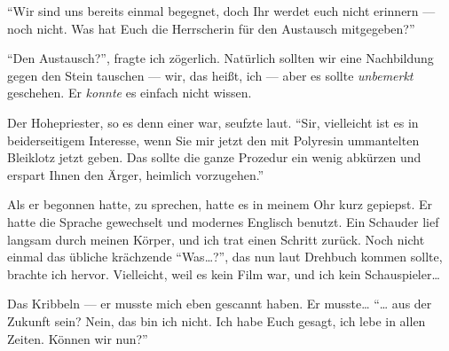 \enquote{Wir sind uns bereits einmal begegnet, doch Ihr werdet euch nicht erinnern --- noch nicht. Was hat Euch die Herrscherin für den Austausch mitgegeben?}

\enquote{Den Austausch?}, fragte ich zögerlich. Natürlich sollten wir eine Nachbildung gegen den Stein tauschen --- wir, das heißt, ich --- aber es sollte \emph{unbemerkt} geschehen. Er \emph{konnte} es einfach nicht wissen.

Der Hohepriester, so es denn einer war, seufzte laut. \enquote{Sir, vielleicht ist es in beiderseitigem Interesse, wenn Sie mir jetzt den mit Polyresin ummantelten Bleiklotz jetzt geben. Das sollte die ganze Prozedur ein wenig abkürzen und erspart Ihnen den Ärger, heimlich vorzugehen.}

Als er begonnen hatte, zu sprechen, hatte es in meinem Ohr kurz gepiepst. Er hatte die Sprache gewechselt und modernes Englisch benutzt. 
Ein Schauder lief langsam durch meinen Körper, und ich trat einen Schritt zurück. Noch nicht einmal das übliche krächzende \enquote{Was\dots{}?}, das nun laut Drehbuch kommen sollte, brachte ich hervor. Vielleicht, weil es kein Film war, und ich kein Schauspieler\dots{}

Das Kribbeln --- er musste mich eben gescannt haben. Er musste\dots{}
\enquote{\dots{} aus der Zukunft sein? Nein, das bin ich nicht. Ich habe Euch gesagt, ich lebe in allen Zeiten. Können wir nun?}
